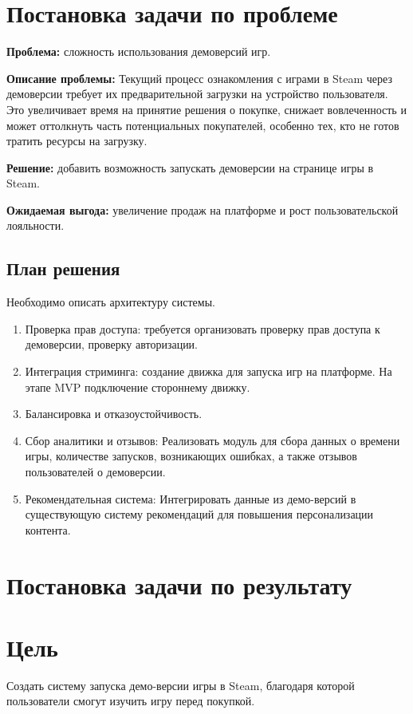 \documentclass[12pt, a4paper]{article}
\begin{document}
\section{Постановка задачи по проблеме}
\textbf{Проблема: } сложность использования 
демоверсий игр.\par
\textbf{Описание проблемы: } Текущий процесс 
ознакомления с играми в Steam через демоверсии 
требует их предварительной загрузки на устройство 
пользователя. Это увеличивает время на принятие 
решения о покупке, снижает вовлеченность и может 
оттолкнуть часть потенциальных покупателей, особенно 
тех, кто не готов тратить ресурсы на загрузку.\par
\textbf{Решение: } добавить возможность запускать 
демоверсии на странице игры в Steam.\par
\textbf{Ожидаемая выгода: } увеличение продаж на 
платформе и рост пользовательской лояльности.

\subsection{План решения}
Необходимо описать архитектуру системы.
\begin{enumerate}
	\item Проверка прав доступа: требуется 
	организовать проверку прав доступа к демоверсии, 
	проверку авторизации.
	\item Интеграция стриминга: создание 
	движка для запуска игр на платформе.
	На этапе MVP подключение стороннему движку.
	\item Балансировка и отказоустойчивость.
	\item Сбор аналитики и отзывов: Реализовать 
	модуль для сбора данных о времени игры, 
	количестве запусков, возникающих ошибках, а 
	также отзывов пользователей о демоверсии.
	\item Рекомендательная система: Интегрировать 
	данные из демо-версий в существующую систему 
	рекомендаций для повышения персонализации 
	контента.
\end{enumerate}
\newpage
\section{Постановка задачи по результату}


\newpage
\section*{Цель}
Создать систему запуска демо-версии игры в Steam, благодаря которой пользователи смогут изучить игру перед покупкой.
\end{document}
